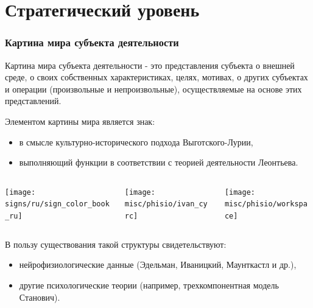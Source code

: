 \documentclass[default]{beamer}
\begin{document}
	\section{Стратегический уровень}
	
	\begin{frame}
		\frametitle{Картина мира субъекта деятельности}
		\scriptsize
			Картина мира субъекта деятельности - это представления субъекта о внешней среде, о своих собственных характеристиках, целях, мотивах, о других субъектах и операции (произвольные и непроизвольные), осуществляемые на основе этих представлений.
			\par\smallskip
			Элементом картины мира является знак:
			\begin{itemize}
				\item в смысле культурно-исторического подхода Выготского-Лурии,
				\item выполняющий функции в соответствии с теорией деятельности Леонтьева.
			\end{itemize}
			\begin{columns}
				\begin{column}{0.4\textwidth}
					\centering
					\texttt{[image: signs/ru/sign\_color\_book\_ru]}
				\end{column}
				\begin{column}{0.6\textwidth}
					\begin{columns}
						\begin{column}{0.5\textwidth}
							\centering
							\texttt{[image: misc/phisio/ivan\_cyrc]}
						\end{column}
						\begin{column}{0.5\textwidth}
							\centering
							\texttt{[image: misc/phisio/workspace]}
						\end{column}
					\end{columns}
					
				\end{column}
			\end{columns}
			В пользу существования такой структуры свидетельствуют:
			\begin{itemize}
				\item нейрофизиологические данные (Эдельман, Иваницкий, Маунткастл и др.),
				\item другие психологические теории (например, трехкомпонентная модель Станович).
			\end{itemize}
			\vspace{-5pt}
			\nocite{*}
			\printbibliography[keyword={sign}, resetnumbers=true]
	\end{frame}
\end{document}
